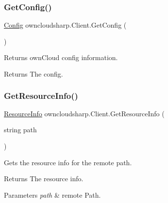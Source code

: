 \subsubsection{\texorpdfstring{Get\+Config()}{GetConfig()}}
{\footnotesize\ttfamily \hyperlink{classowncloudsharp_1_1_types_1_1_config}{Config} owncloudsharp.\+Client.\+Get\+Config (\begin{DoxyParamCaption}{ }\end{DoxyParamCaption})}



Returns own\+Cloud config information. 

\begin{DoxyReturn}{Returns}
The config.
\end{DoxyReturn}
\mbox{\label{classowncloudsharp_1_1_client_aa482194c404ccba36a4095b513c4cf7a}} 
\subsubsection{\texorpdfstring{Get\+Resource\+Info()}{GetResourceInfo()}}
{\footnotesize\ttfamily \hyperlink{classowncloudsharp_1_1_types_1_1_resource_info}{Resource\+Info} owncloudsharp.\+Client.\+Get\+Resource\+Info (\begin{DoxyParamCaption}\item[{string}]{path }\end{DoxyParamCaption})}



Gets the resource info for the remote path. 

\begin{DoxyReturn}{Returns}
The resource info.
\end{DoxyReturn}

\begin{DoxyParams}{Parameters}
{\em path} & remote Path.\\
\hline
\end{DoxyParams}
\mbox{\label{classowncloudsharp_1_1_client_acd8b3359561282563c774b6e4784cb3d}} 

